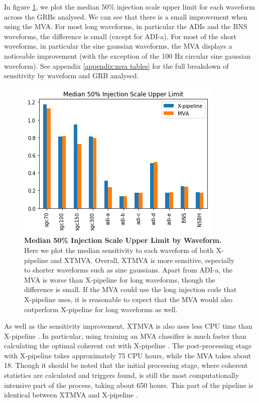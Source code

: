 \documentclass[11pt]{cuthesis}
\newcommand{\xp}{X-pipeline }
\begin{document}
In figure \ref{fig:median injscale}, we plot the median 50\% injection scale upper limit for each waveform across the GRBs analysed. We can see that there is a small improvement when using the MVA. For most long waveforms, in particular the ADIs and the BNS waveforms, the difference is small (except for ADI-a). For most of the short waveforms, in particular the sine gaussian waveforms, the MVA displays a noticeable improvement (with the exception of the 100 Hz circular sine gaussian waveform). See appendix \ref{appendix:mva tables} for the full breakdown of sensitivity by waveform and GRB analysed.

\begin{figure} %
\begin{center}
\includegraphics[width=1.0\linewidth]{median_50pc_injscale.png}
\end{center}
\caption{\textbf{Median 50\% Injection Scale Upper Limit by Waveform.} Here we plot the median sensitivity to each waveform of both \xp and XTMVA. Overall, XTMVA is more sensitive, especially to shorter waveforms such as sine gaussians. Apart from ADI-a, the MVA is worse than \xp for long waveforms, though the difference is small. If the MVA could use the long injection code that \xp uses, it is reasonable to expect that the MVA would also outperform \xp for long waveforms as well. }
\label{fig:median injscale}
\end{figure}

As well as the sensitivity improvement, XTMVA is also uses less CPU time than \xp. In particular, using training an MVA classifier is much faster than calculating the optimal coherent cut with \xp. The post-processing stage with \xp takes approximately 75 CPU hours, while the MVA takes about 18. Though it should be noted that the initial processing stage, where coherent statistics are calculated and triggers found, is still the most computationally intensive part of the process, taking about 650 hours. This part of the pipeline is identical between XTMVA and \xp.
\end{document}
